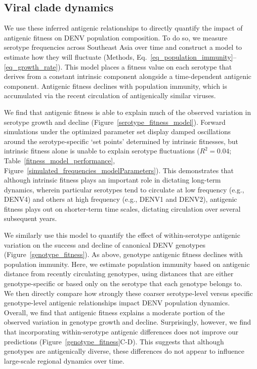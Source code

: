 \documentclass[11pt,oneside,letterpaper]{article}
\begin{document}
\subsection*{Viral clade dynamics}
We use these inferred antigenic relationships to directly quantify the impact of antigenic fitness on DENV population composition.
To do so, we measure serotype frequencies across Southeast Asia over time and construct a model to estimate how they will fluctuate (Methods, Eq.~\ref{eq_population_immunity}--\ref{eq_growth_rate}).
This model places a fitness value on each serotype that derives from a constant intrinsic component alongside a time-dependent antigenic component.
Antigenic fitness declines with population immunity, which is accumulated via the recent circulation of antigenically similar viruses.

We find that antigenic fitness is able to explain much of the observed variation in serotype growth and decline (Figure~\ref{serotype_fitness_model}).
Forward simulations under the optimized parameter set display damped oscillations around the serotype-specific `set points' determined by intrinsic fitnesses, but intrinsic fitness alone is unable to explain serotype fluctuations ($R^2=0.04$; Table~\ref{fitness_model_performance}, Figure~\ref{simulated_frequencies_modelParameters}).
This demonstrates that although intrinsic fitness plays an important role in dictating long-term dynamics, wherein particular serotypes tend to circulate at low frequency (e.g., DENV4) and others at high frequency (e.g., DENV1 and DENV2),  antigenic fitness plays out on shorter-term time scales, dictating circulation over several subsequent years.

We similarly use this model to quantify the effect of within-serotype antigenic variation on the success and decline of canonical DENV genotypes (Figure~\ref{genotype_fitness}).
As above, genotype antigenic fitness declines with population immunity.
Here, we estimate population immunity based on antigenic distance from recently circulating genotypes, using distances that are either genotype-specific or based only on the serotype that each genotype belongs to.
We then directly compare how strongly these coarser serotype-level versus specific genotype-level antigenic relationships impact DENV population dynamics.
Overall, we find that antigenic fitness explains a moderate portion of the observed variation in genotype growth and decline.
Surprisingly, however, we find that incorporating within-serotype antigenic differences does not improve our predictions (Figure~\ref{genotype_fitness}C-D).
This suggests that although genotypes are antigenically diverse, these differences do not appear to influence large-scale regional dynamics over time.
\end{document}

